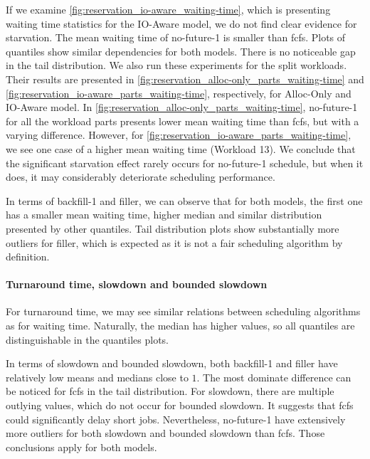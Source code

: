\documentclass[thesis-en.tex]{subfiles}
\begin{document}
If we examine \autoref{fig:reservation_io-aware_waiting-time}, which is presenting waiting time statistics for the IO-Aware model, we do not find clear evidence for starvation. The mean waiting time of no-future-1 is smaller than fcfs. Plots of quantiles show similar dependencies for both models. There is no noticeable gap in the tail distribution. We also run these experiments for the split workloads. Their results are presented in \autoref{fig:reservation_alloc-only_parts_waiting-time} and  \autoref{fig:reservation_io-aware_parts_waiting-time}, respectively, for Alloc-Only and IO-Aware model. In \autoref{fig:reservation_alloc-only_parts_waiting-time}, no-future-1 for all the workload parts presents lower mean waiting time than fcfs, but with a varying difference. However, for \autoref{fig:reservation_io-aware_parts_waiting-time}, we see one case of a higher mean waiting time (Workload 13). We conclude that the significant starvation effect rarely occurs for no-future-1 schedule, but when it does, it may considerably deteriorate scheduling performance.

In terms of backfill-1 and filler, we can observe that for both models, the first one has a smaller mean waiting time, higher median and similar distribution presented by other quantiles. Tail distribution plots show substantially more outliers for filler, which is expected as it is not a fair scheduling algorithm by definition.

\paragraph{Turnaround time, slowdown and bounded slowdown}
For turnaround time, we may see similar relations between scheduling algorithms as for waiting time. Naturally, the median has higher values, so all quantiles are distinguishable in the quantiles plots.

In terms of slowdown and bounded slowdown, both backfill-1 and filler have relatively low means and medians close to $1$. The most dominate difference can be noticed for fcfs in the tail distribution. For slowdown, there are multiple outlying values, which do not occur for bounded slowdown. It suggests that fcfs could significantly delay short jobs. Nevertheless, no-future-1 have extensively more outliers for both slowdown and bounded slowdown than fcfs. Those conclusions apply for both models.
\end{document}
